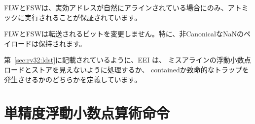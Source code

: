 \begin{comment}
FLW and FSW are only guaranteed to execute atomically if the effective address
is naturally aligned.
\end{comment}

FLWとFSWは、実効アドレスが自然にアラインされている場合にのみ、アトミックに実行されることが保証されています。

\begin{comment}
FLW and FSW do not modify the bits being transferred; in particular, the
payloads of non-canonical NaNs are preserved.
\end{comment}{

FLWとFSWは転送されるビットを変更しません。特に、非CanonicalなNaNのペイロードは保持されます。

\begin{comment}
As described in Section~\ref{sec:rv32:ldst}, the EEI defines whether
misaligned floating-point loads and stores are handled invisibly or raise
a contained or fatal trap.
\end{comment}

第~\ref{sec:rv32:ldst}に記載されているように、EEI は、
ミスアラインの浮動小数点ロードとストアを見えないように処理するか、
containedか致命的なトラップを発生させるかのどちらかを定義しています。

\begin{comment}
\section{Single-Precision Floating-Point Computational Instructions}
\end{comment}
\section{単精度浮動小数点算術命令}
\label{sec:single-float-compute}

\begin{comment}
Floating-point arithmetic instructions with one or two source operands use the
R-type format with the OP-FP major opcode.  FADD.S and FMUL.S perform
single-precision floating-point addition and multiplication respectively,
between {\em rs1} and {\em rs2}. FSUB.S performs the single-precision
floating-point subtraction of {\em rs2} from {\em rs1}.  FDIV.S performs the
single-precision floating-point division of {\em rs1} by {\em rs2}. FSQRT.S
computes the square root of {\em rs1}.  In each case, the result is written to
{\em rd}.
\end{comment}

}
